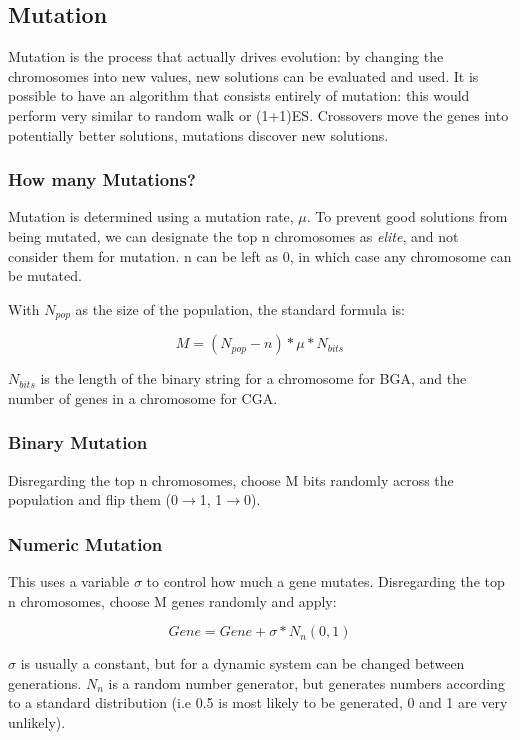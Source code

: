 \subsection{Mutation}
Mutation is the process that actually drives evolution: by changing the chromosomes into new values, new solutions can be evaluated and used. It is possible to have an algorithm that consists entirely of mutation: this would perform very similar to random walk or (1+1)ES. Crossovers move the genes into potentially better solutions, mutations discover new solutions. 

\subsubsection{How many Mutations?}
Mutation is determined using a mutation rate, $\mu$. To prevent good solutions from being mutated, we can designate the top n chromosomes as \emph{elite}, and not consider them for mutation. n can be left as 0, in which case any chromosome can be mutated. 

With $N_{pop}$ as the size of the population, the standard formula is:

\begin{equation}
    M = (N_{pop} - n) * \mu * N_{bits}
\end{equation}

$N_{bits}$ is the length of the binary string for a chromosome for BGA, and the number of genes in a chromosome for CGA.

\subsubsection{Binary Mutation}
Disregarding the top n chromosomes, choose M bits randomly across the population and flip them (0$\rightarrow$1, 1$\rightarrow$0). 

\subsubsection{Numeric Mutation}
This uses a variable $\sigma$ to control how much a gene mutates. Disregarding the top n chromosomes, choose M genes randomly and apply:

\[
    Gene = Gene + \sigma * N_n(0,1)
\]

$\sigma$ is usually a constant, but for a dynamic system can be changed between generations. $N_n$ is a random number generator, but generates numbers according to a standard distribution (i.e 0.5 is most likely to be generated, 0 and 1 are very unlikely). 
